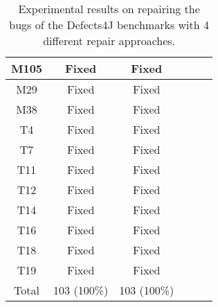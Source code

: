 \begin{table}[!t]
{\begin{tabular}{|c|c|c|c|c|c|}
M105              & Fixed     &Fixed   \\
\hline
M29               & Fixed     &Fixed   \\
M38               & Fixed     &Fixed   \\
\hline
T4                & Fixed     &Fixed   \\
T7                & Fixed     &Fixed   \\
T11               & Fixed     &Fixed   \\
T12               & Fixed     &Fixed   \\
T14               & Fixed     &Fixed   \\
T16               & Fixed     &Fixed   \\
T18               & Fixed     &Fixed   \\
T19               & Fixed     &Fixed   \\
\hline
Total             & 103 (100\%) & 103 (100\%)\\
\hline 
\end{tabular}%
}
\caption{Experimental results on repairing the bugs of the Defects4J benchmarks with 4 different repair approaches.}
\end{table}
